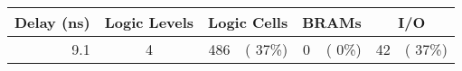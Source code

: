 % 
% 
\begin{tabular}{rc|rr|rr|rr}
 Delay (ns) & Logic Levels & \multicolumn{2}{c|}{Logic Cells} & \multicolumn{2}{c|}{BRAMs} & \multicolumn{2}{c}{I/O} \\
\hline
    9.1 &      4  &   486 & ( 37\%)  &  0 & (  0\%) &    42 & ( 37\%)\\ 
\end{tabular}
